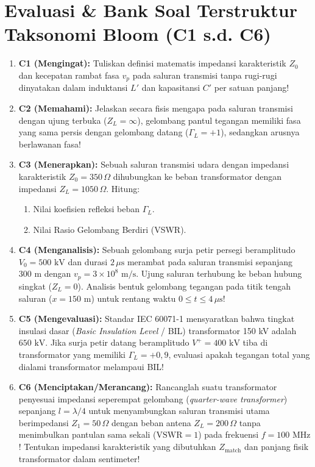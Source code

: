 \documentclass[11pt,a4paper]{article}
\theoremstyle{definition}
\begin{document}
\section{Evaluasi \& Bank Soal Terstruktur Taksonomi Bloom (C1 s.d. C6)}

\begin{enumerate}[leftmargin=*]
    \item \textbf{C1 (Mengingat):} 
    Tuliskan definisi matematis impedansi karakteristik $Z_0$ dan kecepatan rambat fasa $v_p$ pada saluran transmisi tanpa rugi-rugi dinyatakan dalam induktansi $L'$ dan kapasitansi $C'$ per satuan panjang!
    
    \item \textbf{C2 (Memahami):} 
    Jelaskan secara fisis mengapa pada saluran transmisi dengan ujung terbuka ($Z_L = \infty$), gelombang pantul tegangan memiliki fasa yang sama persis dengan gelombang datang ($\Gamma_L = +1$), sedangkan arusnya berlawanan fasa!
    
    \item \textbf{C3 (Menerapkan):} 
    Sebuah saluran transmisi udara dengan impedansi karakteristik $Z_0 = 350\,\Omega$ dihubungkan ke beban transformator dengan impedansi $Z_L = 1050\,\Omega$. Hitung:
    \begin{enumerate}
        \item Nilai koefisien refleksi beban $\Gamma_L$.
        \item Nilai Rasio Gelombang Berdiri (VSWR).
    \end{enumerate}
    
    \item \textbf{C4 (Menganalisis):} 
    Sebuah gelombang surja petir persegi beramplitudo $V_0 = 500\text{ kV}$ dan durasi $2\,\mu\text{s}$ merambat pada saluran transmisi sepanjang $300\text{ m}$ dengan $v_p = 3 \times 10^8\text{ m/s}$. Ujung saluran terhubung ke beban hubung singkat ($Z_L = 0$). Analisis bentuk gelombang tegangan pada titik tengah saluran ($x = 150\text{ m}$) untuk rentang waktu $0 \le t \le 4\,\mu\text{s}$!
    
    \item \textbf{C5 (Mengevaluasi):} 
    Standar IEC 60071-1 mensyaratkan bahwa tingkat insulasi dasar (\textit{Basic Insulation Level} / BIL) transformator 150 kV adalah $650\text{ kV}$. Jika surja petir datang beramplitudo $V^+ = 400\text{ kV}$ tiba di transformator yang memiliki $\Gamma_L = +0{,}9$, evaluasi apakah tegangan total yang dialami transformator melampaui BIL!
    
    \item \textbf{C6 (Menciptakan/Merancang):} 
    Rancanglah suatu transformator penyesuai impedansi seperempat gelombang (\textit{quarter-wave transformer}) sepanjang $l = \lambda/4$ untuk menyambungkan saluran transmisi utama berimpedansi $Z_1 = 50\,\Omega$ dengan beban antena $Z_L = 200\,\Omega$ tanpa menimbulkan pantulan sama sekali ($\text{VSWR} = 1$) pada frekuensi $f = 100\text{ MHz}$! Tentukan impedansi karakteristik yang dibutuhkan $Z_{\text{match}}$ dan panjang fisik transformator dalam sentimeter!
\end{enumerate}
\end{document}
